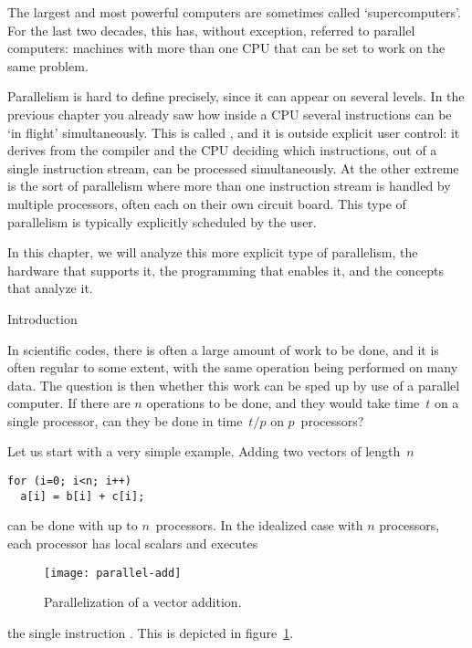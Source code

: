 
The largest and most powerful computers are sometimes called
`supercomputers'. For the last two decades, this has, without
exception, referred to parallel computers: machines with more than one
CPU that can be set to work on the same problem.

Parallelism is hard to define precisely, since it can appear on
several levels. In the previous chapter you already saw how inside a
CPU several instructions can be `in flight' simultaneously. This is
called , and it is outside
explicit user control: it derives from the compiler and the CPU
deciding which instructions, out of a single instruction stream, can
be processed simultaneously. At the other extreme is the sort of
parallelism where more than one instruction stream is handled by
multiple processors, often each on their own circuit board. This type
of parallelism is typically explicitly scheduled by the user.

In this chapter, we will analyze this more explicit type of
parallelism, the hardware that supports it, the programming that
enables it, and the concepts that analyze it.

 {Introduction}
\label{sec:parallel-intro}

In scientific codes, there is often a large amount of work to be done,
and it is often regular to some extent, with the same operation being
performed on many data. The question is then whether this work can be
sped up by use of a parallel computer. If there are $n$ operations to
be done, and they would take time~$t$ on a single processor, can they
be done in time~$t/p$ on $p$~processors?

Let us start with a very simple example. Adding two vectors of length~$n$
\begin{verbatim}
for (i=0; i<n; i++)
  a[i] = b[i] + c[i];
\end{verbatim}
can be done with up to $n$~processors. In the idealized case with $n$
processors, each processor has local scalars  and executes
\begin{figure}[ht]
  \texttt{[image: parallel-add]}
  \caption{Parallelization of a vector addition.}
  \label{fig:par-add}
\end{figure}
the single instruction . This is depicted in
figure~\ref{fig:par-add}.

